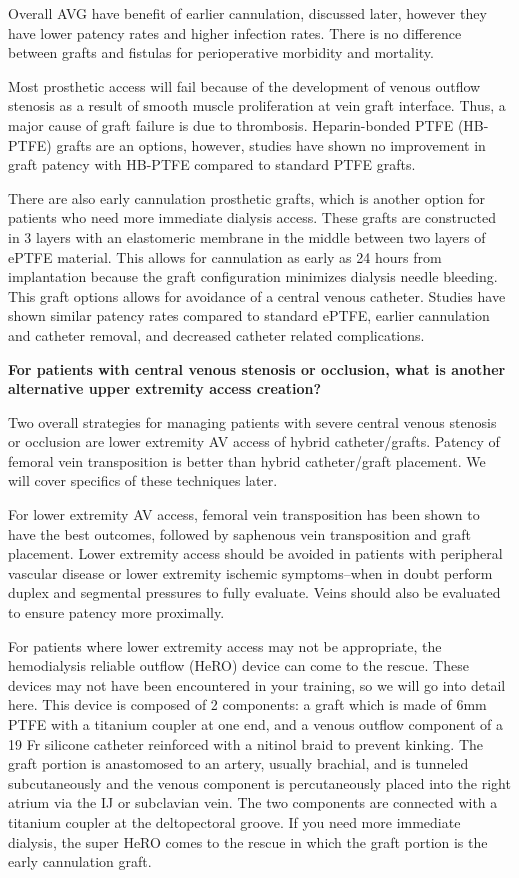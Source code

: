 \documentclass[
]{book}
\begin{document}
Overall AVG have benefit of earlier cannulation, discussed later,
however they have lower patency rates and higher infection rates. There
is no difference between grafts and fistulas for perioperative morbidity
and mortality.\citep{macsata2019}

Most prosthetic access will fail because of the development of venous
outflow stenosis as a result of smooth muscle proliferation at vein
graft interface. Thus, a major cause of graft failure is due to
thrombosis. Heparin-bonded PTFE (HB-PTFE) grafts are an options,
however, studies have shown no improvement in graft patency with HB-PTFE
compared to standard PTFE grafts.\citep{shemesh2015, davies2016}

There are also early cannulation prosthetic grafts, which is another
option for patients who need more immediate dialysis access. These
grafts are constructed in 3 layers with an elastomeric membrane in the
middle between two layers of ePTFE material. This allows for cannulation
as early as 24 hours from implantation because the graft configuration
minimizes dialysis needle bleeding. This graft options allows for
avoidance of a central venous catheter. Studies have shown similar
patency rates compared to standard ePTFE, earlier cannulation and
catheter removal, and decreased catheter related
complications.\citep{alshakarchi2019, wagner2019}

\textbf{For patients with central venous stenosis or occlusion, what is
another alternative upper extremity access creation?}

Two overall strategies for managing patients with severe central venous
stenosis or occlusion are lower extremity AV access of hybrid
catheter/grafts. Patency of femoral vein transposition is better than
hybrid catheter/graft placement.\citep{brownie2016, glickman2011} We will
cover specifics of these techniques later.

For lower extremity AV access, femoral vein transposition has been shown
to have the best outcomes, followed by saphenous vein transposition and
graft placement. Lower extremity access should be avoided in patients
with peripheral vascular disease or lower extremity ischemic
symptoms--when in doubt perform duplex and segmental pressures to fully
evaluate. Veins should also be evaluated to ensure patency more
proximally.\citep{parekh2016}

For patients where lower extremity access may not be appropriate, the
hemodialysis reliable outflow (HeRO) device can come to the rescue.
These devices may not have been encountered in your training, so we will
go into detail here. This device is composed of 2 components: a graft
which is made of 6mm PTFE with a titanium coupler at one end, and a
venous outflow component of a 19 Fr silicone catheter reinforced with a
nitinol braid to prevent kinking. The graft portion is anastomosed to an
artery, usually brachial, and is tunneled subcutaneously and the venous
component is percutaneously placed into the right atrium via the IJ or
subclavian vein. The two components are connected with a titanium
coupler at the deltopectoral groove. If you need more immediate
dialysis, the super HeRO comes to the rescue in which the graft portion
is the early cannulation graft.
\end{document}
